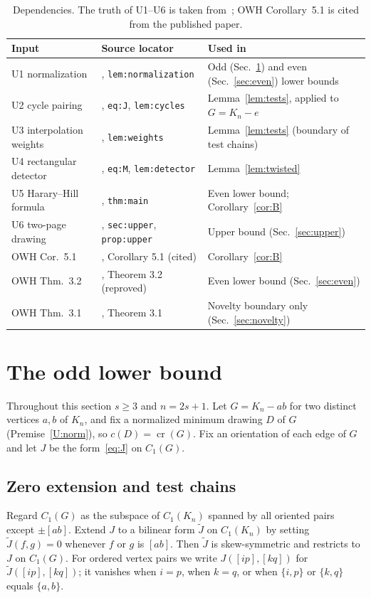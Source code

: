 \documentclass[11pt,a4paper]{article}
\theoremstyle{definition}
\theoremstyle{remark}
\numberwithin{equation}{section}
\newcommand{\crn}{\operatorname{cr}}
\begin{document}
\begin{table}[ht]
\centering
\small
\begin{tabular}{@{}P{0.25\textwidth} P{0.33\textwidth} P{0.36\textwidth}@{}}
\toprule
Input & Source locator & Used in \\
\midrule
U1 normalization & \cite{OAIKn}, \texttt{lem:normalization} & Odd (Sec.~\ref{sec:odd}) and even (Sec.~\ref{sec:even}) lower bounds \\
U2 cycle pairing & \cite{OAIKn}, \texttt{eq:J}, \texttt{lem:cycles} & Lemma~\ref{lem:tests}, applied to $G=K_n-e$ \\
U3 interpolation weights & \cite{OAIKn}, \texttt{lem:weights} & Lemma~\ref{lem:tests} (boundary of test chains) \\
U4 rectangular detector & \cite{OAIKn}, \texttt{eq:M}, \texttt{lem:detector} & Lemma~\ref{lem:twisted} \\
U5 Harary--Hill formula & \cite{OAIKn}, \texttt{thm:main} & Even lower bound; Corollary~\ref{cor:B} \\
U6 two-page drawing & \cite{OAIKn}, \texttt{sec:upper}, \texttt{prop:upper} & Upper bound (Sec.~\ref{sec:upper}) \\
OWH Cor.~5.1 & \cite{OWH}, Corollary 5.1 (cited) & Corollary~\ref{cor:B} \\
OWH Thm.~3.2 & \cite{OWH}, Theorem 3.2 (reproved) & Even lower bound (Sec.~\ref{sec:even}) \\
OWH Thm.~3.1 & \cite{OWH}, Theorem 3.1 & Novelty boundary only (Sec.~\ref{sec:novelty}) \\
\bottomrule
\end{tabular}
\caption{Dependencies. The truth of U1--U6 is taken from~\cite{OAIKn}; OWH Corollary~5.1 is cited from the published paper.}
\label{tab:deps}
\end{table}

\section{The odd lower bound}\label{sec:odd}

Throughout this section $s\ge3$ and $n=2s+1$. Let $G=K_n-ab$ for two distinct vertices $a,b$ of $K_n$, and fix a normalized minimum drawing $D$ of $G$ (Premise~\ref{U:norm}), so $c(D)=\crn(G)$. Fix an orientation of each edge of $G$ and let $J$ be the form~\eqref{eq:J} on $C_1(G)$.

\subsection{Zero extension and test chains}
Regard $C_1(G)$ as the subspace of $C_1(K_n)$ spanned by all oriented pairs except $\pm[ab]$. Extend $J$ to a bilinear form $\widetilde J$ on $C_1(K_n)$ by setting $\widetilde J(f,g)=0$ whenever $f$ or $g$ is $[ab]$. Then $\widetilde J$ is skew-symmetric and restricts to $J$ on $C_1(G)$. For ordered vertex pairs we write $J([ip],[kq])$ for $\widetilde J([ip],[kq])$; it vanishes when $i=p$, when $k=q$, or when $\{i,p\}$ or $\{k,q\}$ equals $\{a,b\}$.
\end{document}
